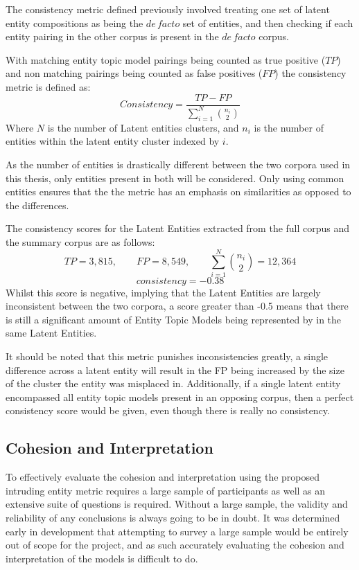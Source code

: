 \documentclass[10pt]{report}
\begin{document}
The consistency metric defined previously involved treating one set of latent entity compositions as being the $de\, facto$ set of entities, and then checking if each entity pairing in the other corpus is present in the $de\, facto$ corpus.

With matching entity topic model pairings being counted as true positive ($TP$) and non matching pairings being counted as false positives ($FP$) the consistency metric is defined as:
\[
  Consistency = \frac{TP - FP}{\sum^{N}_{i=1}{n_i\choose2}}
\]
Where $N$ is the number of Latent entities clusters, and $n_i$ is the number of entities within the latent entity cluster indexed by $i$.

As the number of entities is drastically different between the two corpora used in this thesis, only entities present in both will be considered. Only using common entities ensures that the the metric has an emphasis on similarities as opposed to the differences.

The consistency scores for the Latent Entities extracted from the full corpus and the summary corpus are as follows:
\[
  TP = 3,815, \quad \quad FP = 8,549, \quad \quad \sum^{N}_{i=1}{n_i\choose2} = 12,364
\]
\[
  consistency = -0.38
\]
Whilst this score is negative, implying that the Latent Entities are largely inconsistent between the two corpora, a score greater than -0.5 means that there is still a significant amount of Entity Topic Models being represented by in the same Latent Entities.

It should be noted that this metric punishes inconsistencies greatly, a single difference across a latent entity will result in the FP being increased by the size of the cluster the entity was misplaced in. Additionally, if a single latent entity encompassed all entity topic models present in an opposing corpus, then a perfect consistency score would be given, even though there is really no consistency.


\subsection{Cohesion and Interpretation}
To effectively evaluate the cohesion and interpretation using the proposed intruding entity metric requires a large sample of participants as well as an extensive suite of questions is required. Without a large sample, the validity and reliability of any conclusions is always going to be in doubt. It was determined early in development that attempting to survey a large sample would be entirely out of scope for the project, and as such accurately evaluating the cohesion and interpretation of the models is difficult to do.
\end{document}
